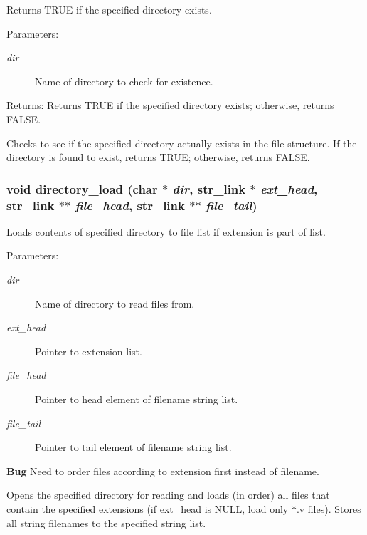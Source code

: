 Returns TRUE if the specified directory exists.

\begin{Desc}
\item[Parameters:]
\begin{description}
\item[{\em dir}]Name of directory to check for existence. \end{description}
\end{Desc}
\begin{Desc}
\item[Returns:]Returns TRUE if the specified directory exists; otherwise, returns FALSE.\end{Desc}
Checks to see if the specified directory actually exists in the file structure. If the directory is found to exist, returns TRUE; otherwise, returns FALSE. 
\subsubsection{\setlength{\rightskip}{0pt plus 5cm}void directory\_\-load (char $\ast$ {\em dir}, {\bf str\_\-link} $\ast$ {\em ext\_\-head}, {\bf str\_\-link} $\ast$$\ast$ {\em file\_\-head}, {\bf str\_\-link} $\ast$$\ast$ {\em file\_\-tail})}\label{util_8h_a6}


Loads contents of specified directory to file list if extension is part of list.

\begin{Desc}
\item[Parameters:]
\begin{description}
\item[{\em dir}]Name of directory to read files from. \item[{\em ext\_\-head}]Pointer to extension list. \item[{\em file\_\-head}]Pointer to head element of filename string list. \item[{\em file\_\-tail}]Pointer to tail element of filename string list.\end{description}
\end{Desc}


\begin{Desc}
\item[{\bf Bug}]Need to order files according to extension first instead of filename.\end{Desc}
Opens the specified directory for reading and loads (in order) all files that contain the specified extensions (if ext\_\-head is NULL, load only $\ast$.v files). Stores all string filenames to the specified string list. 
